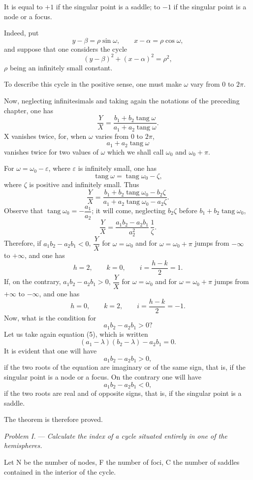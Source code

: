\documentclass[11pt]{article}
\begin{document}
It is equal to $+1$ if the singular point is a saddle; to $-1$ if the singular point is a node or a focus.

Indeed, put
\[
y-\beta=\rho\sin\omega,\qquad x-\alpha=\rho\cos\omega,
\]
and suppose that one considers the cycle
\[
(y-\beta)^2+(x-\alpha)^2=\rho^2,
\]
$\rho$ being an infinitely small constant.

To describe this cycle in the positive sense, one must make $\omega$ vary from $0$ to $2\pi$.

Now, neglecting infinitesimals and taking again the notations of the preceding chapter, one has
\[
\frac YX=\frac{b_1+b_2\operatorname{tang}\omega}{a_1+a_2\operatorname{tang}\omega}.
\]
X vanishes twice, for, when $\omega$ varies from $0$ to $2\pi$,
\[
a_1+a_2\operatorname{tang}\omega
\]
vanishes twice for two values of $\omega$ which we shall call $\omega_0$ and $\omega_0+\pi$.

For $\omega=\omega_0-\varepsilon$, where $\varepsilon$ is infinitely small, one has
\[
\operatorname{tang}\omega=\operatorname{tang}\omega_0-\zeta,
\]
where $\zeta$ is positive and infinitely small. Thus
\[
\frac YX=\frac{b_1+b_2\operatorname{tang}\omega_0-b_2\zeta}{a_1+a_2\operatorname{tang}\omega_0-a_2\zeta}.
\]
Observe that $\operatorname{tang}\omega_0=-\dfrac{a_1}{a_2}$; it will come, neglecting $b_2\zeta$ before $b_1+b_2\operatorname{tang}\omega_0$,
\[
\frac YX=\frac{a_1b_2-a_2b_1}{a_2^2}\,\frac1\zeta.
\]
Therefore, if $a_1b_2-a_2b_1<0$, $\dfrac YX$ for $\omega=\omega_0$ and for $\omega=\omega_0+
\pi$ jumps from $-\infty$ to $+\infty$, and one has
\[
h=2,\qquad k=0,\qquad i=\frac{h-k}{2}=1.
\]
If, on the contrary, $a_1b_2-a_2b_1>0$, $\dfrac YX$ for $\omega=\omega_0$ and for $\omega=\omega_0+
\pi$ jumps from $+\infty$ to $-\infty$, and one has
\[
h=0,\qquad k=2,\qquad i=\frac{h-k}{2}=-1.
\]
Now, what is the condition for
\[
a_1b_2-a_2b_1>0?
\]
Let us take again equation (5), which is written
\[
(a_1-\lambda)(b_2-\lambda)-a_2b_1=0.
\]
It is evident that one will have
\[
a_1b_2-a_2b_1>0,
\]
if the two roots of the equation are imaginary or of the same sign, that is, if the singular point is a node or a focus. On the contrary one will have
\[
a_1b_2-a_2b_1<0,
\]
if the two roots are real and of opposite signs, that is, if the singular point is a saddle.

The theorem is therefore proved.

\emph{Problem I.} --- \emph{Calculate the index of a cycle situated entirely in one of the hemispheres.}

Let N be the number of nodes, F the number of foci, C the number of saddles contained in the interior of the cycle.
\end{document}
